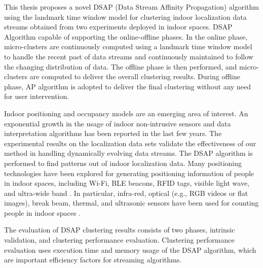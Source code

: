 This thesis proposes a novel DSAP (Data Stream Affinity Propagation) algorithm using the landmark time window model for clustering indoor localization data streams obtained from two experiments deployed in indoor spaces. DSAP Algorithm capable of supporting the online-offline phases. In the online phase, micro-clusters are continuously computed using a landmark time window model to handle the recent past of data streams and continuously maintained to follow the changing distribution of data. The offline phase is then performed, and micro-clusters are computed to deliver the overall clustering results. During offline phase, AP algorithm is adopted to deliver the final clustering without any need for user intervention.

Indoor positioning and occupancy models are an emerging area of interest. An exponential growth in the usage of indoor non-intrusive sensors and data interpretation algorithms has been reported in the last few years. The experimental results on the localization data sets validate the effectiveness of our method in handling dynamically evolving data streams. The DSAP algorithm is performed to find patterns out of indoor localization data.
Many positioning technologies have been explored for generating positioning information of people in indoor spaces, including Wi-Fi, BLE beacons, RFID tags, visible light wave, and ultra-wide band \cite{namiot2015indoor, jeon2018ble}. In particular, infra-red, optical (e.g., RGB videos or flat images), break beam, thermal, and ultrasonic sensors have been used for counting people in indoor spaces \cite{mautz2012indoor}. 

The evaluation of DSAP clustering results consists of two phases, intrinsic validation, and clustering performance evaluation.
Clustering performance evaluation uses execution time and memory usage of the DSAP algorithm, which are important efficiency factors for streaming algorithms.



